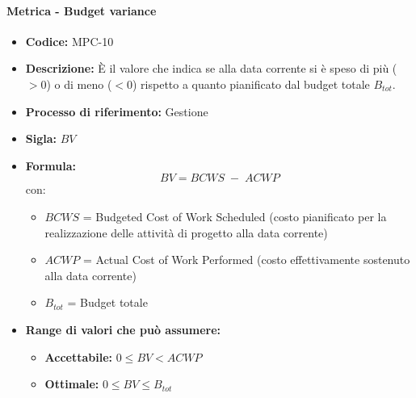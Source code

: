     \paragraph{Metrica - Budget variance}
        \begin{itemize}
            \item \textbf{Codice:} MPC-10 
            \item \textbf{Descrizione:} È il valore che indica se alla data corrente si è speso di più ($>0$) o di meno ($<0$) rispetto a quanto pianificato dal budget totale $B_{tot}$.
            \item \textbf{Processo di riferimento:} Gestione
            \item \textbf{Sigla:} $BV$
            \item \textbf{Formula:} $$BV = {BCWS \; - \; ACWP}$$
            con:
            \begin{itemize}
                \item $BCWS$ = Budgeted Cost of Work Scheduled (costo pianificato per la realizzazione delle attività di progetto alla data corrente)
                \item $ACWP$ = Actual Cost of Work Performed (costo effettivamente sostenuto alla data corrente)
                \item $B_{tot}$ = Budget totale
            \end{itemize}
            \item \textbf{Range di valori che può assumere:}
            \begin{itemize}
                \item \textbf{Accettabile:} $0 \leq BV < ACWP$
                \item \textbf{Ottimale:} $0 \leq BV \leq B_{tot}$
            \end{itemize}
        \end{itemize}


